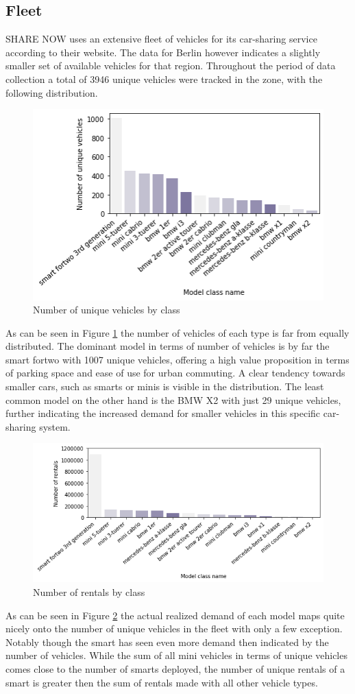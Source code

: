 \subsection{Fleet}
\label{sub_sec:CaseStudy/Fleet}

SHARE NOW uses an extensive fleet of vehicles for its car-sharing service according to their website. The data
for Berlin however indicates a slightly smaller set of available vehicles for that region. Throughout the
period of data collection a total of 3946 unique vehicles were tracked in the zone, with the following
distribution.

\begin{figure}[htbp]
  \centering
  \includegraphics[width=.3\linewidth]{./Figures/fleet.png}
  \caption{Number of unique vehicles by class}
  \label{fig:Fleet}
\end{figure}

As can be seen in Figure \ref{fig:Fleet} the number of vehicles of each type is far from equally distributed.
The dominant model in terms of number of vehicles is by far the smart fortwo with 1007 unique vehicles, 
offering a high value proposition
in terms of parking space and ease of use for urban commuting. A clear tendency towards smaller cars, such as smarts
or minis is visible in the distribution. The least common model on the other hand is the BMW X2 with just 29 unique vehicles,
further indicating the increased demand for smaller vehicles in this specific car-sharing system.

\begin{figure}[htbp]
  \centering
  \includegraphics[width=.4\linewidth]{./Figures/travels.png}
  \caption{Number of rentals by class}
  \label{fig:Rentals}
\end{figure}

As can be seen in Figure \ref{fig:Rentals} the actual realized demand of each model maps quite nicely
onto the number of unique vehicles in the fleet with only a few exception. Notably though the smart has
seen even more demand then indicated by the number of vehicles. While the sum of all mini vehicles in terms
of unique vehicles comes close to the number of smarts deployed, the number of unique rentals of a smart
is greater then the sum of rentals made with all other vehicle types.

